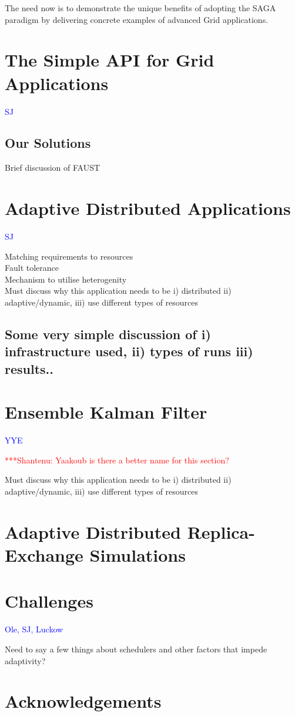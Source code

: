 \documentclass[10pt,letterpaper]{article}
\newcommand{\jhanote}[1]{  {\textcolor{red}     { ***Shantenu: #1 }}}
\newcommand{\jhanote}[1]{}
\begin{document}
The need now is to demonstrate the unique beneﬁts of adopting the SAGA
paradigm by delivering concrete examples of advanced Grid
applications.

\section{The Simple API for Grid Applications}\textcolor{blue}{SJ}


\subsection{Our Solutions}

Brief discussion of FAUST

\section{Adaptive Distributed Applications}  \textcolor{blue}{SJ}

Matching requirements to resources \\
Fault tolerance \\
Mechanism to utilise heterogenity \\

Must discuss why this application needs to be i) distributed ii) adaptive/dynamic, iii) use different types of resources

\subsection{Some very simple discussion of i) infrastructure used,
  ii) types of runs iii) results..}

\section{Ensemble Kalman Filter}  \textcolor{blue}{YYE}

\jhanote{Yaakoub is there a better name for this section?}

Must discuss why this application needs to be i) distributed ii) adaptive/dynamic, iii) use different types of resources

\section{Adaptive Distributed Replica-Exchange Simulations}

\section{Challenges}\textcolor{blue}{Ole, SJ, Luckow}

Need to say a few things about schedulers and other factors
that impede adaptivity? \\


\section*{Acknowledgements}




\end{document}
